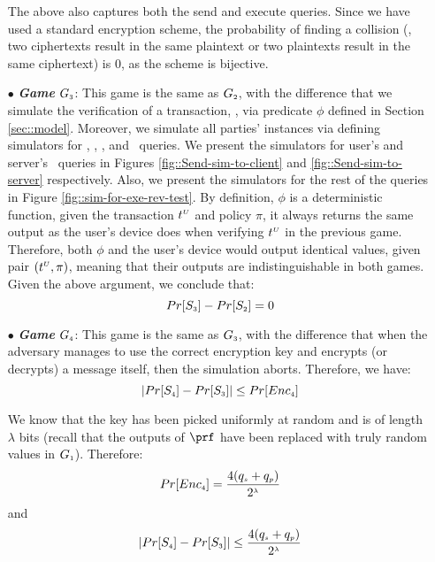 \begin{itemize}
The above also captures both the send and execute queries. Since we have used a standard encryption scheme, the probability of finding a collision (\eg, two ciphertexts result in the same plaintext or two plaintexts result in the same ciphertext) is $0$, as the scheme is bijective. 



\item[$\bullet$] \textit{\textbf{Game}}  $G_{\scriptscriptstyle  3}$: This game is the same as $G_{\scriptscriptstyle  2}$, with the difference that we simulate the verification of a transaction, \ie, via predicate $\phi$ defined in Section \ref{sec::model}. Moreover, we simulate all parties' instances via defining simulators for  \send, \execute, \reveal, and \test\ queries. We present the simulators for user's and server's \send\ queries in Figures \ref{fig::Send-sim-to-client} and \ref{fig::Send-sim-to-server} respectively. Also, we present the simulators for the rest of the queries in Figure \ref{fig::sim-for-exe-rev-test}. By definition,  $\phi$ is a deterministic function, given the transaction $t^{\scriptscriptstyle  U}$ and policy $\pi$, it always returns the same output as the user's device does when verifying $t^{\scriptscriptstyle  U}$ in the previous game.  Therefore, both $\phi$ and the user's device would output identical values, given pair $(t^{\scriptscriptstyle  U}, \pi)$, meaning that their outputs are indistinguishable in both games.  Given the above argument, we conclude that:  
%
\begin{equation}\label{eq::game_3}
Pr[S_{\scriptscriptstyle  3}]-Pr[S_{\scriptscriptstyle  2}]=0
\end{equation}
%
\item[$\bullet$] \textit{\textbf{Game}}  $G_{\scriptscriptstyle  4}$: This game is the same as $G_{\scriptscriptstyle  3}$, with the difference that when the adversary manages to use the correct encryption key and encrypts (or decrypts) a message itself, then the simulation aborts. Therefore, we have: 
%
\begin{equation*}
|Pr[S_{\scriptscriptstyle  4}]-Pr[S_{\scriptscriptstyle  3}]|\leq Pr[Enc_{\scriptscriptstyle  4}]
\end{equation*}


We know that the key has been picked uniformly at random and is of length $\lambda$ bits (recall that the outputs of $\prf$ have been replaced with truly random values in $G_{\scriptscriptstyle  1}$). Therefore:
%
 $$Pr[Enc_{\scriptscriptstyle  4}]=\frac{4(q_{\scriptscriptstyle  s}+q_{\scriptscriptstyle  p})}{2^{\scriptscriptstyle \lambda}}$$ and 
 \begin{equation}\label{eq::game_4}
 |Pr[S_{\scriptscriptstyle  4}]-Pr[S_{\scriptscriptstyle  3}]|\leq \frac{4(q_{\scriptscriptstyle  s}+q_{\scriptscriptstyle  p})}{2^{\scriptscriptstyle \lambda}}
 \end{equation}
%


\end{itemize}
